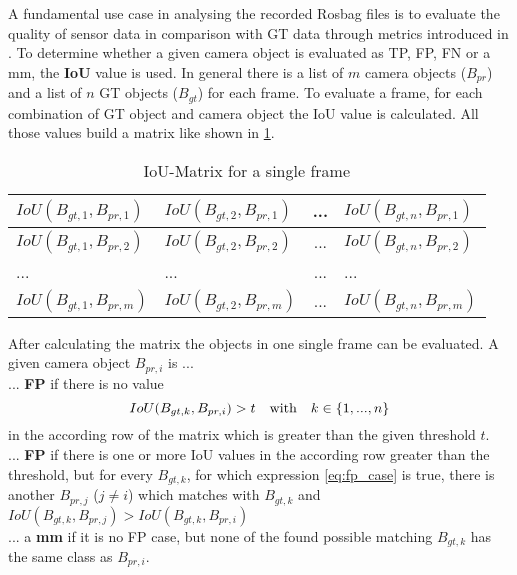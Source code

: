 A fundamental use case in analysing the recorded Rosbag files is to evaluate the quality of sensor data in comparison with GT data through metrics introduced in \cite{Reway}. 
To determine whether a given camera object is evaluated as \ac{TP}, \ac{FP}, \ac{FN} or a \ac{mm}, the \textbf{\ac{IoU}} value is used. 
In general there is a list of $m$ camera objects ($B_{pr}$) and a list of $n$ \ac{GT} objects ($B_{gt}$) for each frame. To evaluate a frame, for each combination of GT object and camera object the IoU value is calculated. All those values build a matrix like shown in \cref{tab:matrix}.
\begin{table}[h]
	\caption{IoU-Matrix for a single frame}
	\begin{tabularx}{\columnwidth}{X|X|c|X}
		\toprule
		$IoU(B_{gt,1}, B_{pr,1})$ & $IoU(B_{gt,2}, B_{pr,1})$ & ... & $IoU(B_{gt,n}, B_{pr,1})$ \\
		\midrule
		$IoU(B_{gt,1}, B_{pr,2})$ & $IoU(B_{gt,2}, B_{pr,2})$ & ... & $IoU(B_{gt,n}, B_{pr,2})$ \\
		\midrule
		... & ... & ... & ... \\
		\midrule		
		$IoU(B_{gt,1}, B_{pr,m})$ & $IoU(B_{gt,2}, B_{pr,m})$ & ... & $IoU(B_{gt,n}, B_{pr,m})$ \\
		\bottomrule
	\end{tabularx}
	\label{tab:matrix}
\end{table}

After calculating the matrix the objects in one single frame can be evaluated. A given camera object $B_{pr,i}$ is ... \\

... \textbf{FP} if there is no value 
\begin{equation}
	IoU(B_{gt,k}, B_{pr,i}) > t \text{\quad with\quad} k \in \left\lbrace 1, ..., n\right\rbrace 
	\label{eq:fp_case}
\end{equation}
in the according row of the matrix which is greater than the given threshold $t$. \\

... \textbf{FP} if there is one or more IoU values in the according row greater than the threshold, but for every $B_{gt,k}$, for which expression \cref{eq:fp_case} is true, there is another $B_{pr,j}$ ($j\neq i$) which matches with $B_{gt,k}$ and $IoU(B_{gt,k}, B_{pr,j}) > IoU(B_{gt,k}, B_{pr,i})$ \\

... a \textbf{\acf{mm}} if it is no FP case, but none of the found possible matching $B_{gt,k}$ has the same class as $B_{pr,i}$. \\

